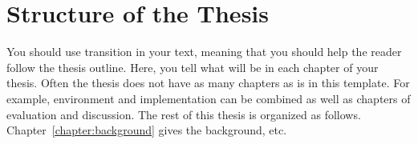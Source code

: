 \section{Structure of the Thesis}
\label{section:structure} 

You should use transition in your text, meaning that you should help
the reader follow the thesis outline. Here, you tell what will be in
each chapter of your thesis. Often the thesis does not have as many
chapters as is in this template. For example, environment and
implementation can be combined as well as chapters of evaluation and
discussion.  The rest of this thesis is organized as
follows. Chapter~\ref{chapter:background} gives the background, etc.

